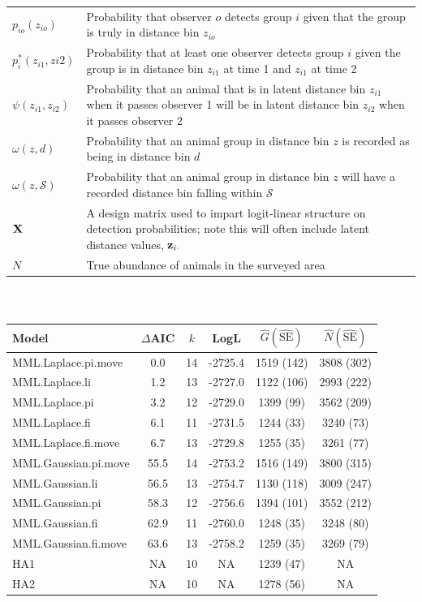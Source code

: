 \documentclass[12pt,fleqn]{article}
\begin{document}
\begin{table}[ht]
\begin{tabular}{p{2cm}p{13cm}}
  $p_{io}(z_{io})$ & Probability that observer $o$ detects group $i$ given that the group is truly in distance bin $z_{io}$\\
  $p_i^*(z_{i1},z{i2})$ & Probability that at least one observer detects group $i$ given the group is in distance bin $z_{i1}$ at time 1 and $z_{i1}$ at time 2\\
  $\psi(z_{i1},z_{i2})$ & Probability that an animal that is in latent distance bin $z_{i1}$ when it passes observer 1 will be in latent distance bin $z_{i2}$ when it passes observer 2 \\
  $\omega(z,d)$ & Probability that an animal group in distance bin $z$ is recorded as being in distance bin $d$ \\
  $\omega(z,\mathcal{S})$ & Probability that an animal group in distance bin $z$ will have a recorded distance bin falling within $\mathcal{S}$ \\
  ${\bf X}$ & A design matrix used to impart logit-linear structure on detection probabilities; note this will often include latent distance values, ${\bf z}_{i \cdot}$  \\
  $N$ & True abundance of animals in the surveyed area \\
\hline
\end{tabular}
\\
\end{table}


\begin{table}[ht]
\caption{
}
\label{tab:ests}
\raggedright
\begin{tabular}{lccccc}
  \hline
  Model & $\Delta$AIC & $k$ & LogL & $\hat{G}(\hat{\textrm{SE}})$ & $\hat{N}(\hat{\textrm{SE}})$  \\
  \hline
  MML.Laplace.pi.move & 0.0 & 14 & -2725.4 & 1519 (142) & 3808 (302) \\
  MML.Laplace.li & 1.2 & 13 & -2727.0 & 1122 (106) & 2993 (222) \\
  MML.Laplace.pi & 3.2 & 12 & -2729.0 & 1399 (99) & 3562 (209) \\
  MML.Laplace.fi & 6.1 & 11 & -2731.5 & 1244 (33) & 3240 (73) \\
  MML.Laplace.fi.move & 6.7 & 13 & -2729.8 & 1255 (35) & 3261 (77) \\
  MML.Gaussian.pi.move & 55.5 & 14 & -2753.2 & 1516 (149) & 3800 (315) \\
  MML.Gaussian.li & 56.5 & 13 & -2754.7 & 1130 (118) & 3009 (247) \\
  MML.Gaussian.pi & 58.3 & 12 & -2756.6 & 1394 (101) & 3552 (212) \\
  MML.Gaussian.fi & 62.9 & 11 & -2760.0 & 1248 (35) & 3248 (80) \\
  MML.Gaussian.fi.move & 63.6 & 13 & -2758.2 & 1259 (35) & 3269 (79) \\  
  HA1 & NA & 10 & NA & 1239 (47) & NA \\
  HA2 & NA & 10 & NA & 1278 (56) & NA \\
\hline
\end{tabular}
\end{table}
\end{document}
